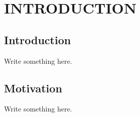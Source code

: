 \documentclass[a4paper, 13pt]{report}
\begin{document}
\chapter{INTRODUCTION}
\section{Introduction}






\par Write something here.\\
\section{Motivation}
\par Write something here.\\
\end{document}
